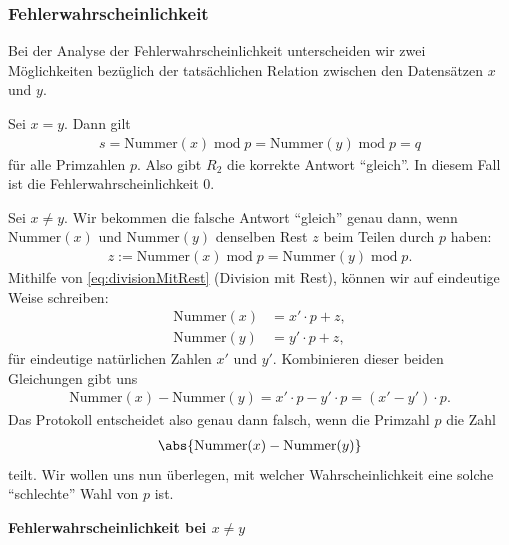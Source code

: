 \subsubsection{Fehlerwahrscheinlichkeit}
Bei der Analyse der Fehlerwahrscheinlichkeit unterscheiden wir zwei Möglichkeiten bezüglich der tatsächlichen Relation zwischen den Datensätzen $x$ und $y$.
\begin{aenum}
	\item Sei $x = y$. Dann gilt
	\begin{align*}
		s = \text{Nummer}(x)\; \text{mod} \; p = \text{Nummer}(y)\; \text{mod} \; p = q
	\end{align*}
	für alle Primzahlen $p$. Also gibt $R_2$ die korrekte Antwort \enquote{gleich}. In diesem Fall ist die Fehlerwahrscheinlichkeit $0$.
	\item Sei $x\neq y$. Wir bekommen die falsche Antwort \enquote{gleich} genau dann, wenn $\text{Nummer}(x)$ und $\text{Nummer}(y)$ denselben Rest $z$ beim Teilen durch $p$ haben:
	\begin{align*}
		z := \text{Nummer}(x)\; \text{mod} \; p = \text{Nummer}(y)\; \text{mod} \; p.
	\end{align*}
	Mithilfe von \cref{eq:divisionMitRest} (Division mit Rest), können wir auf eindeutige Weise schreiben:
	\begin{align*}
		\text{Nummer}(x) & = x'\cdot p + z, \\
		\text{Nummer}(y) & = y'\cdot p + z,
	\end{align*}
	für eindeutige natürlichen Zahlen $x'$ und $y'$. Kombinieren dieser beiden Gleichungen gibt uns
	\begin{align*}
		\text{Nummer}(x)-\text{Nummer}(y) = x'\cdot p -  y'\cdot p = (x'-y')\cdot p.
	\end{align*}
	Das Protokoll entscheidet also genau dann falsch, wenn die Primzahl $p$ die Zahl
	\begin{align*}
		\abs{\text{Nummer}(x)-\text{Nummer}(y)}
	\end{align*}
	teilt. Wir wollen uns nun überlegen, mit welcher Wahrscheinlichkeit eine solche \enquote{schlechte} Wahl von $p$ ist.

	\bigskip
	\textbf{Fehlerwahrscheinlichkeit bei $x\neq y$}


\end{aenum}
